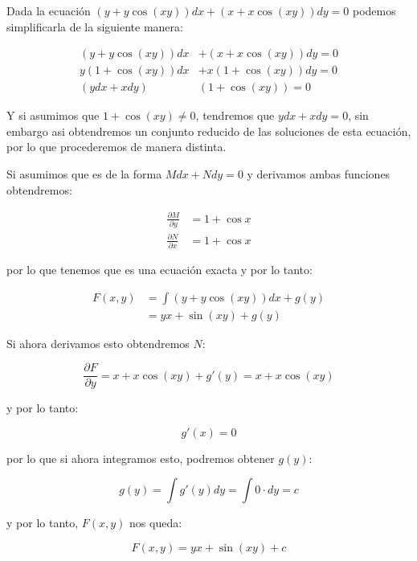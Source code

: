 		\begin{ejemplo}
			Dada la ecuación $(y + y\cos{(xy)})dx + (x + x\cos{(xy)})dy = 0$ podemos simplificarla de la siguiente manera:

			\begin{align*}
				(y + y\cos{(xy)})dx &+ (x + x\cos{(xy)})dy = 0 \\
				y(1 + \cos{(xy)})dx &+ x(1 + \cos{(xy)})dy = 0 \\
				(y dx + x dy)&(1 + \cos{(xy)}) = 0
			\end{align*}

			Y si asumimos que $1 + \cos{(xy)} \ne 0$, tendremos que $y dx + x dy = 0$, sin embargo asi obtendremos un conjunto reducido de las soluciones de esta ecuación, por lo que procederemos de manera distinta.

			Si asumimos que es de la forma $M dx + N dy = 0$ y derivamos ambas funciones obtendremos:

			\begin{align*}
				\frac{\partial M}{\partial y} &= 1 + \cos{x} \\
				\frac{\partial N}{\partial x} &= 1 + \cos{x} 
			\end{align*}

			por lo que tenemos que es una ecuación exacta y por lo tanto:

			\begin{align*}
				F(x, y) &= \int (y + y \cos{(xy)}) dx + g(y) \\
				&= yx + \sin{(xy)} + g(y)
			\end{align*}

			Si ahora derivamos esto obtendremos $N$:

			\begin{equation*}
				\frac{\partial F}{\partial y} = x + x \cos{(xy)} + g'(y) = x + x \cos{(xy)}
			\end{equation*}

			y por lo tanto:

			\begin{equation*}
				g'(x) = 0
			\end{equation*}

			por lo que si ahora integramos esto, podremos obtener $g(y)$:

			\begin{equation*}
				g(y) = \int g'(y) dy = \int 0 \cdot dy = c
			\end{equation*}

			y por lo tanto, $F(x, y)$ nos queda:

			\begin{equation*}
				F(x, y) = yx + \sin{(xy)} + c
			\end{equation*}
		\end{ejemplo}

